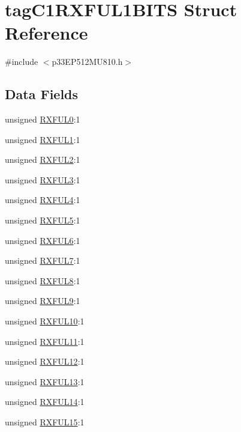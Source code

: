 \hypertarget{structtag_c1_r_x_f_u_l1_b_i_t_s}{}\section{tag\+C1\+R\+X\+F\+U\+L1\+B\+I\+TS Struct Reference}
\label{structtag_c1_r_x_f_u_l1_b_i_t_s}


{\ttfamily \#include $<$p33\+E\+P512\+M\+U810.\+h$>$}

\subsection*{Data Fields}
\begin{DoxyCompactItemize}
\item 
unsigned \hyperlink{structtag_c1_r_x_f_u_l1_b_i_t_s_ae756b430660e9e481fba2ca438b547dc}{R\+X\+F\+U\+L0}\+:1
\item 
unsigned \hyperlink{structtag_c1_r_x_f_u_l1_b_i_t_s_af87a275bb397711a3bc83c1fc6103054}{R\+X\+F\+U\+L1}\+:1
\item 
unsigned \hyperlink{structtag_c1_r_x_f_u_l1_b_i_t_s_a4f5302ac168a05086314273be46e4c6c}{R\+X\+F\+U\+L2}\+:1
\item 
unsigned \hyperlink{structtag_c1_r_x_f_u_l1_b_i_t_s_a156443e10fec742c255f6d9daefa9b7e}{R\+X\+F\+U\+L3}\+:1
\item 
unsigned \hyperlink{structtag_c1_r_x_f_u_l1_b_i_t_s_a70136dd055d84e91b11b84c3440d24e6}{R\+X\+F\+U\+L4}\+:1
\item 
unsigned \hyperlink{structtag_c1_r_x_f_u_l1_b_i_t_s_ae255451f608aa893cf3fb8d3dba00942}{R\+X\+F\+U\+L5}\+:1
\item 
unsigned \hyperlink{structtag_c1_r_x_f_u_l1_b_i_t_s_a86fba67150007acacde5099de1fb81ed}{R\+X\+F\+U\+L6}\+:1
\item 
unsigned \hyperlink{structtag_c1_r_x_f_u_l1_b_i_t_s_a5312a47e81bdc805b786012f0352d30f}{R\+X\+F\+U\+L7}\+:1
\item 
unsigned \hyperlink{structtag_c1_r_x_f_u_l1_b_i_t_s_ad17d5829356ed65ce1d18665178866ff}{R\+X\+F\+U\+L8}\+:1
\item 
unsigned \hyperlink{structtag_c1_r_x_f_u_l1_b_i_t_s_a103e4f37d0fd339da6f11ef9d24e04a0}{R\+X\+F\+U\+L9}\+:1
\item 
unsigned \hyperlink{structtag_c1_r_x_f_u_l1_b_i_t_s_adc7d2d6733137388616554521e93c5fd}{R\+X\+F\+U\+L10}\+:1
\item 
unsigned \hyperlink{structtag_c1_r_x_f_u_l1_b_i_t_s_a2008464385ee4a5ccf21e9f3cb07d7e5}{R\+X\+F\+U\+L11}\+:1
\item 
unsigned \hyperlink{structtag_c1_r_x_f_u_l1_b_i_t_s_a964b6545eb6b6089457dcf8fe8a5ca06}{R\+X\+F\+U\+L12}\+:1
\item 
unsigned \hyperlink{structtag_c1_r_x_f_u_l1_b_i_t_s_a552563cf134c9b4452979eccaf6ec606}{R\+X\+F\+U\+L13}\+:1
\item 
unsigned \hyperlink{structtag_c1_r_x_f_u_l1_b_i_t_s_a086d6be637f0b3ce869087178f474730}{R\+X\+F\+U\+L14}\+:1
\item 
unsigned \hyperlink{structtag_c1_r_x_f_u_l1_b_i_t_s_a2369c06d5340e50aebf84f6952b9b0b9}{R\+X\+F\+U\+L15}\+:1
\end{DoxyCompactItemize}


